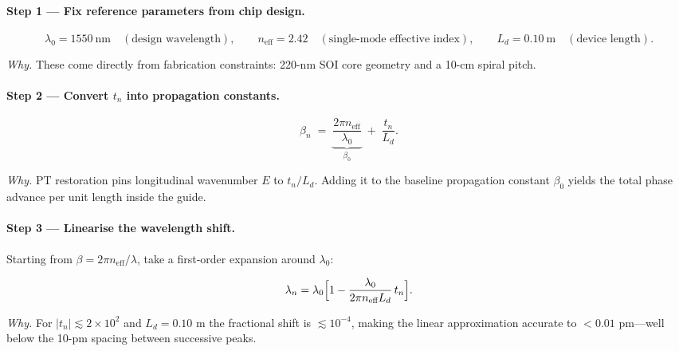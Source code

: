 \documentclass[11pt]{article}
\begin{document}
\vspace{0.6em}
\paragraph{Step 1 — Fix reference parameters from chip design.}

\[
   \lambda_{0}=1550~\mathrm{nm}
   \quad(\text{design wavelength}),\qquad
   n_{\text{eff}}=2.42
   \quad(\text{single-mode effective index}),\qquad
   L_{d}=0.10~\mathrm{m}
   \quad(\text{device length}).
\]

\emph{Why.}\;  
These come directly from fabrication constraints:
220-nm SOI core geometry and a 10-cm spiral pitch.

\vspace{0.4em}
\paragraph{Step 2 — Convert $t_{n}$ into propagation constants.}

\[
   \beta_{n}
   \;=\;
   \underbrace{\frac{2\pi n_{\text{eff}}}{\lambda_{0}}}_{\beta_{0}}
   \;+\;
   \frac{t_{n}}{L_{d}} .
\]

\emph{Why.}\;  
PT restoration pins longitudinal wavenumber $E$ to
\(t_{n}/L_{d}\).  
Adding it to the baseline propagation constant \(\beta_{0}\) yields the
total phase advance per unit length inside the guide.

\vspace{0.4em}
\paragraph{Step 3 — Linearise the wavelength shift.}

Starting from \(\beta=2\pi n_{\text{eff}}/\lambda\),
take a first-order expansion around \(\lambda_{0}\):

\[
   \lambda_{n}
   = \lambda_{0}
     \Bigl[
       1 - \frac{\lambda_{0}}{2\pi n_{\text{eff}}L_{d}}\,
           t_{n}
     \Bigr].
\]

\emph{Why.}\;  
For $|t_{n}|\lesssim2\times10^{2}$ and $L_{d}=0.10$ m the fractional
shift is $\lesssim10^{-4}$, making the linear approximation accurate to
$<0.01$ pm—well below the 10-pm spacing between successive peaks.

\vspace{0.4em}
\end{document}
